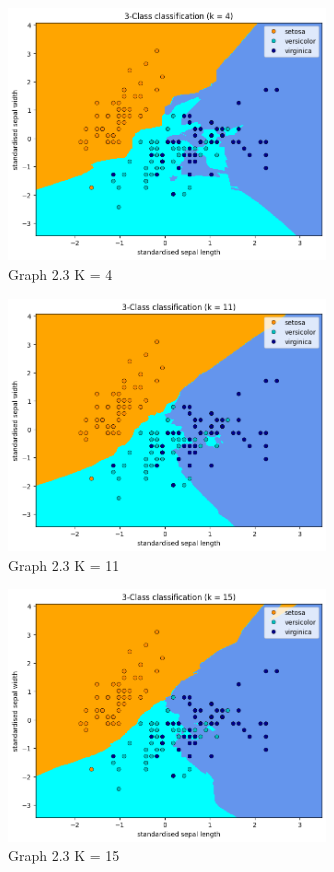 \documentclass[12pt]{article}
\begin{document}
\begin{itemize}
  \begin{figure}[H]
    \centering
    \includegraphics[width=0.75\textwidth]{2_3_k4.png}
    \caption{Graph 2.3 K = 4}
    \label{fig:graph2.3_k4}
  \end{figure}

  \begin{figure}[H]
    \centering
    \includegraphics[width=0.75\textwidth]{2_3_k11.png}
    \caption{Graph 2.3 K = 11}
    \label{fig:graph2.3_k11}
  \end{figure}

  \begin{figure}[H]
    \centering
    \includegraphics[width=0.75\textwidth]{2_3_k15.png}
    \caption{Graph 2.3 K = 15}
    \label{fig:graph2.3_k15}
  \end{figure}


\end{itemize}
\end{document}
